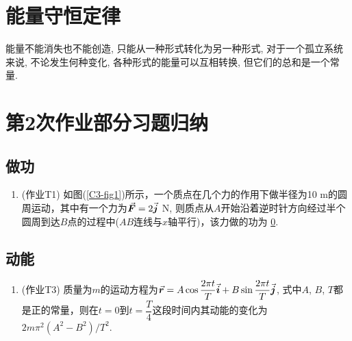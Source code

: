 \section{能量守恒定律} \label{3.5}

\begin{axiom}[能量守恒定律] \label{C3-ax1}
	能量不能消失也不能创造, 只能从一种形式转化为另一种形式, 对于一个孤立系统来说, 不论发生何种变化, 各种形式的能量可以互相转换, 但它们的总和是一个常量. 
\end{axiom}

\section{第2次作业部分习题归纳} \label{3.6}

\subsection{做功}

\begin{enumerate}
	
	\item (作业T1) 如图(\ref{C3-fig1})所示，一个质点在几个力的作用下做半径为10 m的圆周运动，其中有一个力为$\va*{F} = 2 \va*{j}$ N, 则质点从$A$开始沿着逆时针方向经过半个圆周到达$B$点的过程中($AB$连线与$x$轴平行)，该力做的功为 \uline{0}. 
	
\end{enumerate}

\subsection{动能}

\begin{enumerate}
	
	\item (作业T3) 质量为$m$的运动方程为$\va*{r} = A \cos \dfrac{2 \pi t}{T} \va*{i} + B \sin \dfrac{2 \pi t}{T} \va*{j}$, 式中$A$, $B$, $T$都是正的常量，则在$t = 0$到$t = \dfrac{T}{4}$这段时间内其动能的变化为 \uline{$2 m \pi^2 (A^2 - B^2) / T^2$}. 
	
\end{enumerate}

